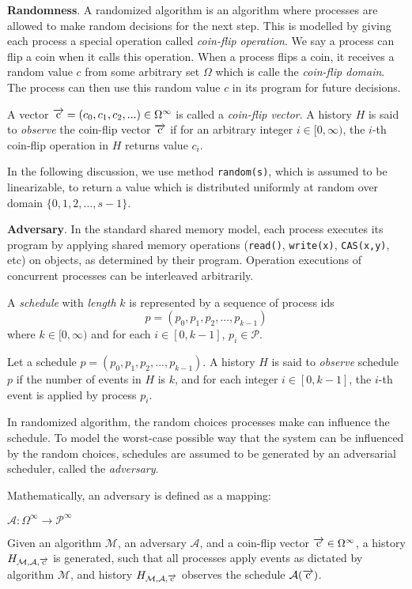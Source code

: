 \textbf{Randomness}.
A randomized algorithm is an algorithm where processes are allowed to make random decisions for the next step.
This is modelled by giving each process a special operation called \emph{coin-flip operation}. We say a process can flip a coin
when it calls this operation. When a process flips a coin, it receives a random value $c$ from some arbitrary set $\Omega$
which is calle the \emph{coin-flip domain}. The process can then use this random value $c$ in its program for future decisions.

A vector $\overrightarrow{\rm c} = (c_0, c_1, c_2,...) \in \Omega^{\infty}$ is called a \emph{coin-flip vector}.
A history $H$ is said to \emph{observe} the coin-flip vector $\overrightarrow{\rm c}$ if
for an arbitrary integer $i \in [0, \infty)$, the $i$-th coin-flip operation in $H$ returns value $c_i$.

In the following discussion, we use method \texttt{random(s)}, which is assumed
to be linearizable, to return a value which is distributed uniformly at random over domain
$\{0, 1, 2,..., s-1\}$.

\textbf{Adversary}.
In the standard shared memory model, each process executes its program by applying
shared memory operations (\texttt{read()}, \texttt{write(x)}, \texttt{CAS(x,y)}, etc) on objects,
as determined by their program. Operation executions of concurrent processes
can be interleaved arbitrarily.

A \emph{schedule} with \emph{length} $k$ is represented by a sequence of process ids
$$p = (p_0, p_1, p_2,..., p_{k-1})$$ where $k \in [0, \infty)$ and for each $i \in [0, k-1]$,
$p_i \in \mathcal{P}$.

Let a schedule $p = (p_0, p_1, p_2,..., p_{k-1})$.
A history $H$ is said to \emph{observe} schedule $p$ if the number of events in $H$ is $k$,
and for each integer $i \in [0, k-1]$, the $i$-th event is applied by process $p_i$.

In randomized algorithm, the random choices processes make can influence the schedule.
To model the worst-case possible way that the system can be influenced by the random choices,
schedules are assumed to be generated by an adversarial scheduler, called the \emph{adversary}.

Mathematically, an adversary is defined as a mapping:
\begin{center}
$\mathcal{A} :  \Omega^{\infty} \to \mathcal{P}^{\infty}$
\end{center}

Given an algorithm $\mathcal{M}$, an adversary $\mathcal{A}$, and
a coin-flip vector $\overrightarrow{\rm c} \in \Omega^{\infty}$,
a history $H_{\mathcal{M},\mathcal{A}, \overrightarrow{\rm c}}$ is generated, such that all
processes apply events as dictated by algorithm $\mathcal{M}$, and history
$H_{\mathcal{M}, \mathcal{A}, \overrightarrow{\rm c}}$
observes the schedule $\mathcal{A(\overrightarrow{\rm c})}$.

